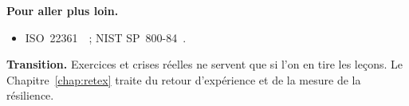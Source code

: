 \bigskip

\begin{boxinfo}
\textbf{Pour aller plus loin.}
\begin{itemize}
    \item ISO~22361~\cite{iso22361_2022}~; NIST SP~800-84~\cite{nist80084}.
\end{itemize}
\end{boxinfo}

\begin{boxinfo}
\textbf{Transition.} Exercices et crises réelles ne servent que si l'on en
tire les leçons. Le Chapitre~\ref{chap:retex} traite du retour
d'expérience et de la mesure de la résilience.
\end{boxinfo}
